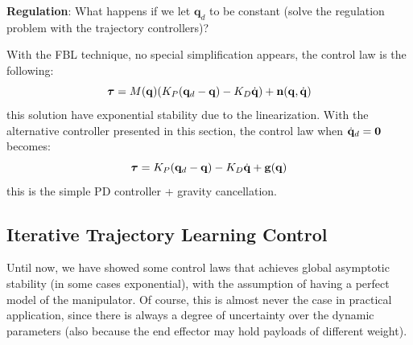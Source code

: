 \documentclass[10pt, a4paper]{report}
\newcommand{\q}{{\mathbf q}}
\begin{document}
\noindent\textbf{Regulation}: What happens if we let $\q_d$ to be constant (solve the regulation problem with the trajectory controllers)? 

With the FBL technique, no special simplification appears, the control law is the following:\begin{equation}
    \btau=M(\q)(K_P(\q_d-\q)-K_D\dq)+\mathbf n(\q,\dq)
\end{equation}
this solution have exponential stability due to the linearization. With the alternative controller presented in this section, the control law when ${\dot{\mathbf q}}_d=\mathbf 0$ becomes:\begin{equation}
    \btau=K_P(\q_d-\q)-K_D\dq+\mathbf g(\q)
\end{equation}
this is the simple PD controller + gravity cancellation.
\subsection{Iterative Trajectory Learning Control}
Until now, we have showed some control laws that achieves global asymptotic stability (in some cases exponential), with the assumption of having a perfect model of the manipulator. Of course, this is almost never the case in practical application, since there is always a degree of uncertainty over the dynamic parameters (also because the end effector may hold payloads of different weight).\bigskip 
\end{document}
